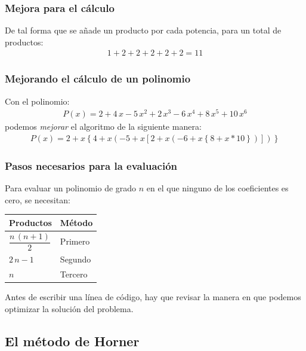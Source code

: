 \documentclass[12pt]{beamer}
\begin{document}
\begin{frame}
\frametitle{Mejora para el cálculo}
De tal forma que se añade un producto por cada potencia, para un total de productos:
\pause
\begin{align*}
1 + 2 + 2 + 2 + 2 + 2 = 11
\end{align*}
\end{frame}
\begin{frame}
\frametitle{Mejorando el cálculo de un polinomio}
Con el polinomio:
\pause
\begin{align*}
P (x)= 2 + 4 \, x - 5 \, x^{2} + 2 \, x^{3} - 6 \, x^{4} + 8 \, x^{5} + 10 \, x^{6}
\end{align*}
\pause
podemos \emph{mejorar} el algoritmo de la siguiente manera:
\pause
\begin{align*}
P(x) = 2 + x \left\lbrace 4 + x \left( -5 + x \left[ 2 + x \left(-6 +x \left\lbrace 8+x*10 \right\rbrace \right) \right] \right) \right\rbrace
\end{align*}
\end{frame}
\begin{frame}
\frametitle{Pasos necesarios para la evaluación}
Para evaluar un polinomio de grado $n$ en el que ninguno de los coeficientes es cero, se necesitan:
\pause
\begin{table}
\centering
\begin{tabular}{l l}
Productos & Método \\ \hline
$\dfrac{n \, (n + 1)}{2}$ & Primero \\ \hline
$2 \, n - 1$ & Segundo \\ \hline
$n$ & Tercero \\ \hline
\end{tabular}
\end{table}
\pause
Antes de escribir una línea de código, hay que revisar la manera en que podemos optimizar la solución del problema.
\end{frame}

\subsection{El método de Horner}
\end{document}
